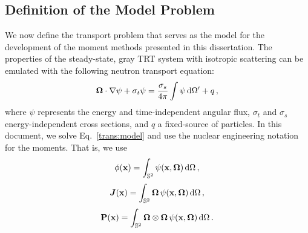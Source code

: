 \documentclass[../doc.tex]{subfiles}
\begin{document}
\subsection{Definition of the Model Problem}
We now define the transport problem that serves as the model for the development of the moment methods presented in this dissertation. The properties of the steady-state, gray TRT system with isotropic scattering can be emulated with the following neutron transport equation: 
	\begin{equation} \label{trans:model}
		\boldsymbol{\Omega}\cdot\nabla\psi + \sigma_t \psi = \frac{\sigma_s}{4\pi} \int \psi \mathop{}\!\mathrm{d} \Omega' + q \,,
	\end{equation}
where $\psi$ represents the energy and time-independent angular flux, $\sigma_t$ and $\sigma_s$ energy-independent cross sections, and $q$ a fixed-source of particles. In this document, we solve Eq.~\ref{trans:model} and use the nuclear engineering notation for the moments. That is, we use 
	\begin{equation}
		\phi(\boldsymbol{\mathrm{x}}) = \int_{\mathbb{S}^2} \psi(\boldsymbol{\mathrm{x}},\boldsymbol{\Omega}) \mathop{}\!\mathrm{d} \Omega \,,
	\end{equation}
	\begin{equation}
		\boldsymbol{J}(\boldsymbol{\mathrm{x}}) = \int_{\mathbb{S}^2} \boldsymbol{\Omega}\,\psi(\boldsymbol{\mathrm{x}},\boldsymbol{\Omega}) \mathop{}\!\mathrm{d} \Omega \,,
	\end{equation}
	\begin{equation}
		\boldsymbol{\mathrm{P}}(\boldsymbol{\mathrm{x}}) = \int_{\mathbb{S}^2} \boldsymbol{\Omega}\otimes\boldsymbol{\Omega}\,\psi(\boldsymbol{\mathrm{x}},\boldsymbol{\Omega})\mathop{}\!\mathrm{d}\Omega \,. 
	\end{equation}
\end{document}
